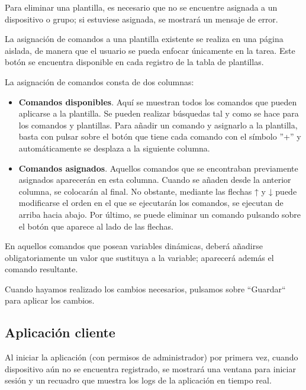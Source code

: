 Para eliminar una plantilla, es necesario que no se encuentre asignada a un dispositivo o grupo; si estuviese asignada,
se mostrará un mensaje de error.

La asignación de comandos a una plantilla existente se realiza en una página aislada, de manera que el usuario se
pueda enfocar únicamente en la tarea.
Este botón se encuentra disponible en cada registro de la tabla de plantillas.


La asignación de comandos consta de dos columnas:
\begin{itemize}
    \item \textbf{Comandos disponibles}.
    Aquí se muestran todos los comandos que pueden aplicarse a la plantilla.
    Se pueden realizar búsquedas tal y como se hace para los comandos y plantillas.
    Para añadir un comando y asignarlo a la plantilla, basta con pulsar sobre el botón que tiene cada comando con el
    símbolo ''+'' y automáticamente se desplaza a la siguiente columna.
    \item \textbf{Comandos asignados}.
    Aquellos comandos que se encontraban previamente asignados aparecerán en esta columna.
    Cuando se añaden desde la anterior columna, se colocarán al final.
    No obstante, mediante las flechas ↑ y ↓ puede modificarse el orden en el que se ejecutarán los comandos, se ejecutan
    de arriba hacia abajo.
    Por último, se puede eliminar un comando pulsando sobre el botón que aparece al lado de las flechas.

\end{itemize}



En aquellos comandos que posean variables dinámicas, deberá añadirse obligatoriamente un valor que sustituya a la
variable; aparecerá además el comando resultante.

Cuando hayamos realizado los cambios necesarios, pulsamos sobre ``Guardar`` para aplicar los cambios.

\subsection{Aplicación cliente}

Al iniciar la aplicación (con permisos de administrador) por primera vez, cuando dispositivo aún no se encuentra
registrado, se mostrará una ventana para iniciar sesión y un recuadro que muestra los logs de la aplicación en tiempo
real.

